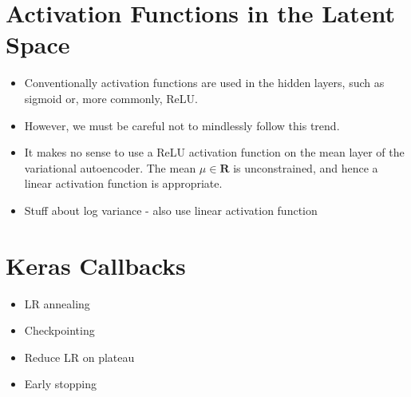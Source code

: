 %
%
%
%
%
\section{Activation Functions in the Latent Space}
\begin{itemize}
\item Conventionally activation functions are used in the hidden layers, such as sigmoid or, more commonly, ReLU.
\item However, we must be careful not to mindlessly follow this trend.
\item It makes no sense to use a ReLU activation function on the mean layer of the variational autoencoder. The mean $\mu \in \mathbf{R}$ is unconstrained, and hence a linear activation function is appropriate.
\item Stuff about log variance - also use linear activation function
\end{itemize}



%
%
%
%
%
\section{Keras Callbacks}
\begin{itemize}
\item LR annealing
\item Checkpointing
\item Reduce LR on plateau
\item Early stopping
\end{itemize}